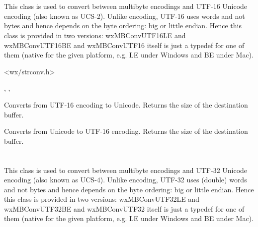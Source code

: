 \section{}\label{wxmbconvutf16}

This class is used to convert between multibyte encodings and UTF-16 Unicode
encoding (also known as UCS-2). Unlike  encoding,
UTF-16 uses words and not bytes and hence depends on the byte ordering:
big or little endian. Hence this class is provided in two versions:
wxMBConvUTF16LE and wxMBConvUTF16BE and wxMBConvUTF16 itself is just a typedef
for one of them (native for the given platform, e.g. LE under Windows and BE
under Mac).




<wx/strconv.h>




, 
, 


\label{wxmbconvutf16mb2wc}


Converts from UTF-16 encoding to Unicode. Returns the size of the destination
buffer.

\label{wxmbconvutf16wc2mb}


Converts from Unicode to UTF-16 encoding. Returns the size of the destination
buffer.


\section{}\label{wxmbconvutf32}

This class is used to convert between multibyte encodings and UTF-32 Unicode
encoding (also known as UCS-4). Unlike  encoding,
UTF-32 uses (double) words and not bytes and hence depends on the byte ordering:
big or little endian. Hence this class is provided in two versions:
wxMBConvUTF32LE and wxMBConvUTF32BE and wxMBConvUTF32 itself is just a typedef
for one of them (native for the given platform, e.g. LE under Windows and BE
under Mac).


